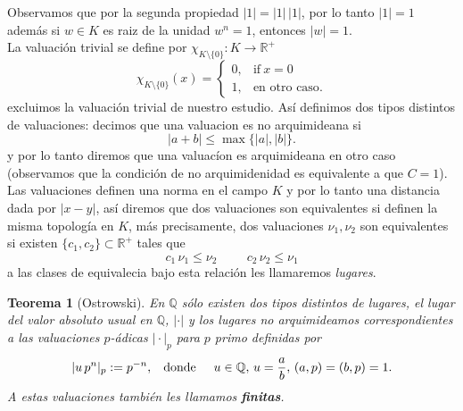 \documentclass[letterpaper]{report}
\newtheorem{teorema}{Teorema}[chapter]
\newcommand{\rac}{\ensuremath{ \mathbb Q }}
\newcommand{\re}{\ensuremath{\mathbb R }}
\begin{document}
\noindent Observamos que por la segunda propiedad $\vert 1\vert=\vert 1\vert\,\vert 1\vert$, por lo tanto $\vert 1\vert=1$ además si $w\in K$ es raiz de la unidad $w^n=1$, entonces $\vert w\vert=1$.\\

La valuación trivial se define por $\chi_{K\setminus\lbrace 0\rbrace}:K\rightarrow\re^{+}$
\begin{equation}
	\chi_{K\setminus\lbrace 0\rbrace}(x)=
	    \begin{cases}
      		0, & \text{if}\ x=0 \\
      		1, & \text{en otro caso}.
    	\end{cases}
\end{equation}
\noindent excluimos la valuación trivial de nuestro estudio. Así definimos dos tipos distintos de valuaciones: decimos que una valuacion es no arquimideana si 
\begin{equation}
	\vert a+b\vert\leq\max\lbrace\vert a\vert,\vert b\vert\rbrace.
\end{equation}
\noindent y por lo tanto diremos que una valuacíon es arquimideana en otro caso (observamos que la condición de no arquimidenidad es equivalente a que $C=1$).\\

Las valuaciones definen una norma en el campo $K$ y por lo tanto una distancia dada por $\vert x-y\vert$, así diremos que dos valuaciones son equivalentes si definen la misma topología en $K$, más precisamente, dos valuaciones $\nu_1,\nu_2$ son equivalentes si existen \hbox{$\lbrace c_1,c_2\rbrace\subset\re^{+}$} tales que
$$c_1\,\nu_1\leq \nu_2	\hspace{1cm}	c_2\,\nu_2\leq\nu_1$$
\noindent a las clases de equivalecia bajo esta relación les llamaremos \textit{lugares}.

\begin{teorema}[Ostrowski]
En $\rac$ sólo existen dos tipos distintos de lugares, el lugar del valor absoluto usual en $\rac$, $\vert\cdot\vert$ y los lugares no arquimideamos correspondientes a las valuaciones $p$-ádicas $\vert\cdot\vert_p$ para $p$ primo definidas por
\begin{equation}
	\vert u\,p^n\vert_p:=p^{-n},\hspace{0.3cm}\text{donde}\hspace{0.5cm}u\in\rac,\,u=\frac{a}{b},\,(a,p)=(b,p)=1.
\end{equation}
\noindent A estas valuaciones también les llamamos \textbf{finitas}. 
\end{teorema}
\end{document}
